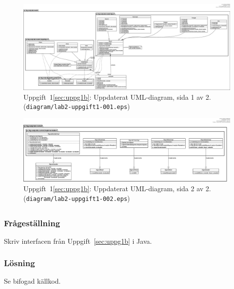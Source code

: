 \begin{figure}
\centering
\includegraphics[width=\linewidth]{diagram/lab2-uppgift1-001.eps}
\caption{Uppgift~1\ref{sec:uppg1b}: Uppdaterat UML-diagram, sida 1 av 2.
(\texttt{diagram/lab2-uppgift1-001.eps})}
\label{fig:uppg1b1}
\end{figure}

\begin{figure}
\centering
\includegraphics[width=\linewidth]{diagram/lab2-uppgift1-002.eps}
\caption{Uppgift~1\ref{sec:uppg1b}: Uppdaterat UML-diagram, sida 2 av 2.
(\texttt{diagram/lab2-uppgift1-002.eps})}
\label{fig:uppg1b2}
\end{figure}


\subsection{}\label{sec:uppg1c}
\subsubsection*{Frågeställning}
Skriv interfacen från Uppgift~\ref{sec:uppg1b} i Java.

\subsubsection*{Lösning}
Se bifogad källkod.


